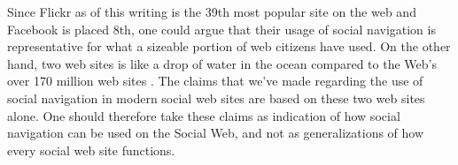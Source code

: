 Since Flickr as of this writing is the 39th most popular site on the web
and Facebook is placed 8th,%
one could argue that their usage of social navigation is representative
for what a sizeable portion of web citizens have used. On the other hand, two
web sites is like a drop of water in the ocean compared to the Web's over
170 million web sites \citep{netcraft08}. The claims that we've made
regarding the use of social navigation in modern social web sites are based
on these two web sites alone. One should therefore take these claims
as indication of how social navigation can be used on the Social Web, and not
as generalizations of how every social web site functions.

